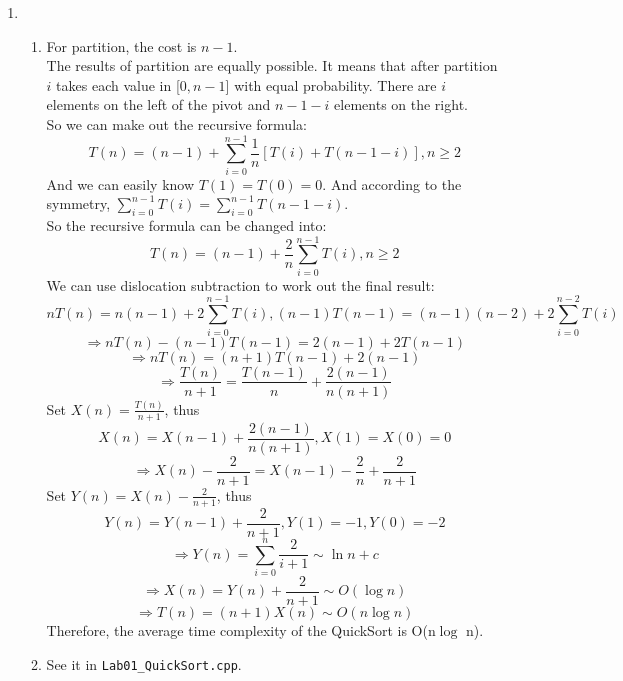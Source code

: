 \documentclass[12pt,a4paper]{article}
\makeatletter
\newtheorem*{solution}{Solution}
\theoremstyle{definition}
\renewenvironment{solution}[1][Solution] {\par\pushQED{\qed}\normalfont\topsep6\p@\@plus6\p@\relax\trivlist\item[\hskip\labelsep\bfseries#1\@addpunct{.}]\ignorespaces}{\popQED\endtrivlist\@endpefalse} \makeatother
\makeatother
\begin{document}
\begin{enumerate}
\begin{solution}
\begin{enumerate}
    		\item For partition, the cost is $n-1$.\\
    		The results of partition are equally possible. It means that after partition $i$ takes each value in [$0, n-1$] with equal probability. There are $i$ elements on the left of the pivot and $n-1-i$ elements on the right.\\
    		So we can make out the recursive formula:
    		\[
    		T(n) = (n-1)+ \sum_{i=0}^{n-1}\frac{1}{n}[T(i)+T(n-1-i)], n\geq 2
    		\]
    		And we can easily know $T(1)=T(0)=0$. And according to the symmetry, $\sum_{i=0}^{n-1}T(i)=\sum_{i=0}^{n-1}T(n-1-i)$.\\
    		So the recursive formula can be changed into:
    		\[
    		T(n) = (n-1)+ \frac{2}{n}\sum_{i=0}^{n-1}T(i), n\geq 2
    		\]
    		We can use dislocation subtraction to work out the final result:
    		\[nT(n) = n(n-1)+2\sum_{i=0}^{n-1}T(i), (n-1)T(n-1) = (n-1)(n-2)+2\sum_{i=0}^{n-2}T(i)
    		\]
    		\[\Rightarrow nT(n)-(n-1)T(n-1) = 2(n-1)+2T(n-1)
    		\]
    		\[\Rightarrow nT(n) = (n+1)T(n-1)+2(n-1)
    		\]
    		\[\Rightarrow \frac{T(n)}{n+1}=\frac{T(n-1)}{n}+\frac{2(n-1)}{n(n+1)}
    		\]
    		Set $X(n)=\frac{T(n)}{n+1}$, thus
    		\[X(n)=X(n-1)+\frac{2(n-1)}{n(n+1)}, X(1)=X(0)=0
    		\]
    		\[\Rightarrow X(n)-\frac{2}{n+1}=X(n-1)-\frac{2}{n}+\frac{2}{n+1}
    		\]
    		Set $Y(n)=X(n)-\frac{2}{n+1}$, thus
    		\[Y(n)=Y(n-1)+\frac{2}{n+1}, Y(1)=-1,Y(0)=-2
    		\]
    		\[\Rightarrow Y(n)=\sum_{i=0}^{n}\frac{2}{i+1}\sim\ln n+c
    		\]
    		\[\Rightarrow X(n)=Y(n)+\frac{2}{n+1} \sim O(\log n)
    		\]
    		\[\Rightarrow T(n)=(n+1)X(n)\sim O(n\log n)
    		\]
    		Therefore, the average time complexity of the QuickSort is O(n$\log$ n). \\
    		
    		\item See it in \texttt{Lab01\_QuickSort.cpp}. \\
    		

\end{enumerate}
\end{solution}
\end{enumerate}
\end{document}
